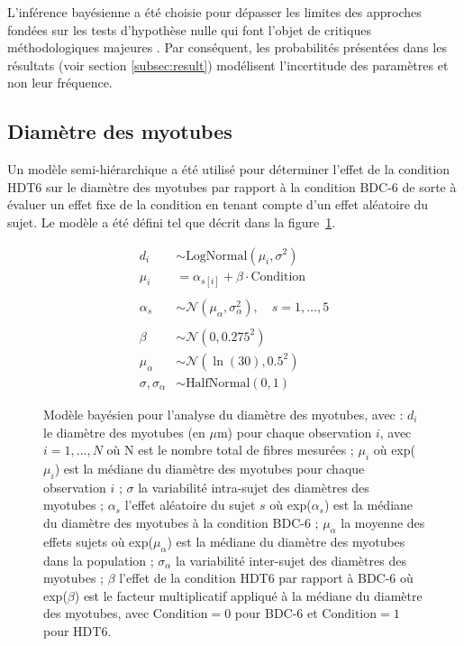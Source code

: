 \documentclass[11pt]{report}
\begin{document}
L'inférence bayésienne a été choisie pour dépasser les limites des approches fondées sur les tests d'hypothèse nulle qui font l'objet de critiques méthodologiques majeures \parencite{Amrhein2019Mar}. Par conséquent, les probabilités présentées dans les résultats (voir section \ref{subsec:result}) modélisent l'incertitude des paramètres et non leur fréquence.

\subsection{Diamètre des myotubes}

Un modèle semi-hiérarchique a été utilisé pour déterminer l'effet de la condition HDT6 sur le diamètre des myotubes par rapport à la condition BDC-6 de sorte à évaluer un effet fixe de la condition en tenant compte d'un effet aléatoire du sujet. Le modèle a été défini tel que décrit dans la figure~\ref{fig:modèle}.

\begin{figure}[h!]
	\centering
	\[
	\begin{aligned}
		d_i &\sim \text{LogNormal}(\mu_i, \sigma^2) \\
		\mu_i &= \alpha_{s[i]} + \beta \cdot \text{Condition} \\
		\\
		\alpha_s &\sim \mathcal{N}(\mu_{\alpha}, \sigma_{\alpha}^2), \quad s = 1, \dots, 5 \\
		\\
		\beta &\sim \mathcal{N}(0, 0.275^2) \\
		\mu_{\alpha} &\sim \mathcal{N}(\ln(30), 0.5^2) \\
		\sigma, \sigma_{\alpha} &\sim \text{HalfNormal}(0, 1)
	\end{aligned}
	\]
	\caption[Modèle bayésien pour l'analyse du diamètre des myotubes.]{Modèle bayésien pour l'analyse du diamètre des myotubes, avec : 
	\newline $d_i$ le diamètre des myotubes (en $\mu$m) pour chaque observation $i$, avec $i = 1,...,N$ où N est le nombre total de fibres mesurées ; $\mu_i$ où exp($\mu_i$) est la médiane du diamètre des myotubes pour chaque observation $i$ ; $\sigma$ la variabilité intra-sujet des diamètres des myotubes ; $\alpha_s$ l'effet aléatoire du sujet $s$ où exp($\alpha_s$) est la médiane du diamètre des myotubes à la condition BDC-6 ; $\mu_{\alpha}$ la moyenne des effets sujets où exp($\mu_{\alpha}$) est la médiane du diamètre des myotubes dans la population ; $\sigma_{\alpha}$ la variabilité inter-sujet des diamètres des myotubes ; $\beta$ l'effet de la condition HDT6 par rapport à BDC-6 où exp($\beta$) est le facteur multiplicatif appliqué à la médiane du diamètre des myotubes, avec $\text{Condition} = 0$ pour BDC-6 et $\text{Condition} = 1$ pour HDT6.}
	\label{fig:modèle}
\end{figure}
\end{document}

